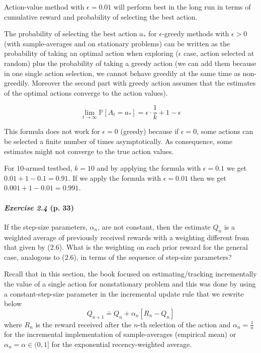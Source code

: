\documentclass[10pt,a4paper]{article}
\begin{document}
\bigskip
Action-value method with $\epsilon=0.01$ will perform best in the long run in terms of cumulative reward and probability of selecting the best action.

The probability of selecting the best action $a_*$ for $\epsilon$-greedy methods with $\epsilon > 0$ (with sample-averages and on stationary problems) can be written as the probability of taking an optimal action when exploring ($\epsilon$ case, action selected at random) plus the probability of taking a greedy action (we can add them because in one single action selection, we cannot behave greedily at the same time as non-greedily. Moreover the second part with greedy action assumes that the estimates of the optimal actions converge to the action values).

\begin{equation}
\lim_{t\to\infty}\mathbb{P}[A_t = a_*] = \epsilon\cdot\frac{1}{k}+ 1 - \epsilon
\end{equation}

This formula does not work for $\epsilon = 0$ (greedy) because if $\epsilon=0$, some actions can be selected a finite number of times asymptotically. As consequence, some estimates might not converge to the true action values.

For $10$-armed testbed, $k=10$ and by applying the formula with $\epsilon=0.1$ we get $0.01 + 1 - 0.1 = 0.91$. If we apply the formula with $\epsilon=0.01$ then we get $0.001 + 1 - 0.01 = 0.991$.

\clearpage
\paragraph{\textit{Exercise 2.4} (p. 33)} If the step-size parameters, $\alpha_n$, are not constant, then the estimate $Q_n$ is
a weighted average of previously received rewards with a weighting different from that
given by ($2.6$). What is the weighting on each prior reward for the general case, analogous
to ($2.6$), in terms of the sequence of step-size parameters?

\bigskip
Recall that in this section, the book focused on estimating/tracking incrementally the value of a single action for nonstationary problem and this was done by using a constant-step-size parameter in the incremental update rule that we rewrite below
\begin{equation}
Q_{n+1} \doteq Q_n + \alpha_n [R_n - Q_n]
\end{equation}
where $R_n$ is the reward received after the $n$-th selection of the action and $\alpha_n=\frac{1}{n}$ for the incremental implementation of sample-averages (empirical mean) or $\alpha_n=\alpha \in (0, 1]$ for the exponential recency-weighted average.
\end{document}
